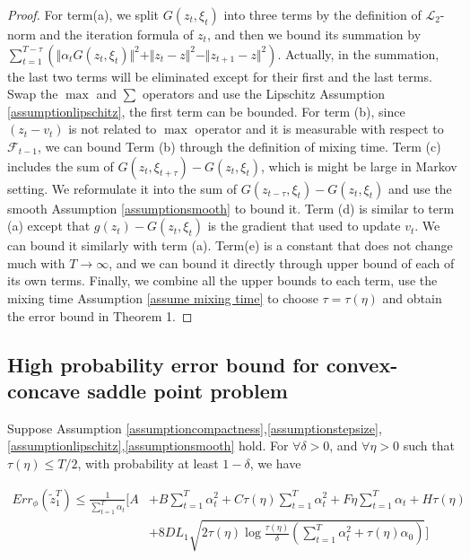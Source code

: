 \documentclass[twoside,11pt]{article}
\numberwithin{equation}{section}
\newcommand{\huaf}{\mathcal{F}}
\begin{document}
\begin{proof}
		For term(a), we split $ G(z_t,\xi_t) $ into three terms by the definition of $ \mathcal{L} _2$-norm and the iteration formula of $ z_t $, and then we bound its summation by $ \sum_{t=1}^{T-\tau} \left(\Vert \alpha_t G(z_t,\xi_t) \Vert^2  + \Vert z_t - z \Vert ^2 - \Vert z_{t+1}  - z\Vert^2 \right) $. Actually, in the summation, the last two terms will be eliminated except for their first and the last terms. Swap the $ \max $ and $ \sum $ operators and use the Lipschitz Assumption \ref{assumptionlipschitz}, the first term can   be bounded. For term (b), since   $(z_t-v_t) $ is not related to $ \max  $ operator and it is measurable with respect to $ \huaf_{t-1} $, we can bound Term (b) through the definition of mixing time. Term (c) includes the sum of $  G (z_t,\xi_{t+\tau}) -  G (z_t,\xi_{t})  $, which is might be large in Markov setting. We reformulate it into the sum of $  G (z_{t-\tau},\xi_{t }) -  G (z_t,\xi_{t}) $  and use the smooth Assumption \ref{assumptionsmooth} to bound it. Term (d) is similar to term (a) except that $ g(z_t) - G(z_t,\xi_t) $ is the gradient that used to update $ v_t $. We can bound it similarly with term (a). Term(e) is a constant that does not change much with $ T\to \infty $, and we can bound it directly through upper bound of each of its own terms. Finally, we combine all the upper bounds to each term,  use the mixing time Assumption \ref{assume mixing time} to choose $ \tau = \tau(\eta) $ and  obtain the error bound in Theorem 1.	
	\end{proof}
	
	\subsection{High probability   error bound for convex-concave saddle point problem}
	
	\begin{theorem}\label{highprobability}
		
		Suppose Assumption \ref{assumptioncompactness},\ref{assumptionstepsize},\ref{assumptionlipschitz},\ref{assumptionsmooth} hold. For $\forall \delta>0$, and $\forall \eta > 0 $ such that $ \tau(\eta)\le T/2$, with probability at least $ 1-\delta$, we have
		 
		\begin{align*}
		Err_\phi(\tilde{z}_1^T)   
		\le  		\frac{1}{\sum\limits_{t=1}^{T}\alpha_t} \Bigg[ A  &+B \sum_{t=1}^{T}\alpha_t^2 + C\tau(\eta)\sum_{t=1}^{T}\alpha_t^2  + F\eta\sum_{t=1}^{T}\alpha_t + H\tau(\eta) \\
		&+  8DL_1 \sqrt{2\tau(\eta) \log\frac{\tau(\eta)}{\delta} \left(\sum_{t=1}^{T}\alpha_t^2 + \tau(\eta)\alpha_0 \right)} \Bigg]
		\end{align*}
		 
		
		
		
	\end{theorem}
	
\end{document}
